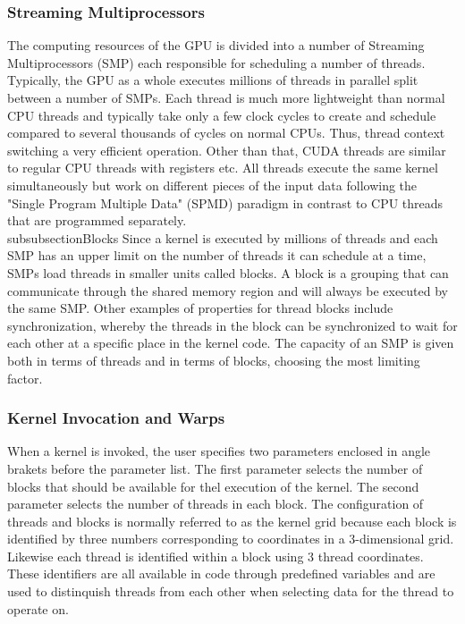 \subsubsection{Streaming Multiprocessors}
The computing resources of the GPU is divided into a number of Streaming Multiprocessors (SMP) each responsible for scheduling a number of threads. Typically, the GPU as a whole executes millions of threads in parallel split between a number of SMPs. Each thread is much more lightweight than normal CPU threads and typically take only a few clock cycles to create and schedule compared to several thousands of cycles on normal CPUs. Thus, thread context switching a very efficient operation. Other than that, CUDA threads are similar to regular CPU threads with registers etc. All threads execute the same kernel simultaneously but work on different pieces of the input data following the "Single Program Multiple Data" (SPMD) paradigm in contrast to CPU threads that are programmed separately. \\

subsubsection{Blocks}
Since a kernel is executed by millions of threads and each SMP has an upper limit on the number of threads it can schedule at a time, SMPs load threads in smaller units called blocks. A block is a grouping that can communicate through the shared memory region and will always be executed by the same SMP. Other examples of properties for thread blocks include synchronization, whereby the threads in the block can be synchronized to wait for each other at a specific place in the kernel code. The capacity of an SMP is given both in terms of threads and in terms of blocks, choosing the most limiting factor.

\subsubsection{Kernel Invocation and Warps}
When a kernel is invoked, the user specifies two parameters enclosed in angle brakets before the parameter list. The first parameter selects the number of blocks that should be available for thel execution of the kernel. The second parameter selects the number of threads in each block. The configuration of threads and blocks is normally referred to as the kernel grid because each block is identified by three numbers corresponding to coordinates in a 3-dimensional grid. Likewise each thread is identified within a block using 3 thread coordinates. These identifiers are all available in code through predefined variables and are used to distinquish threads from each other when selecting data for the thread to operate on.

